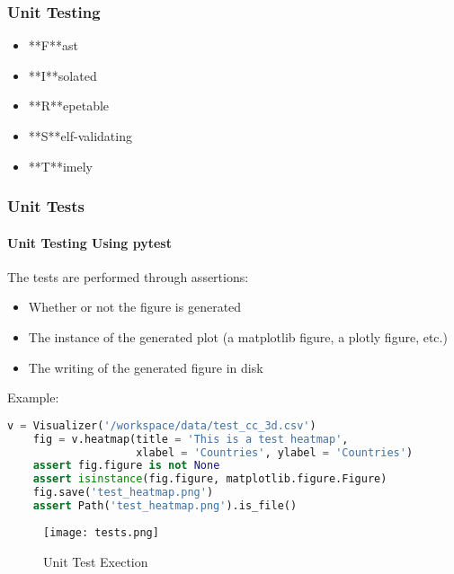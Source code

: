 \begin{frame}
  \frametitle{Unit Testing}

  \begin{itemize}
    \item **F**ast
    \item **I**solated
    \item **R**epetable 
    \item **S**elf-validating
    \item **T**imely
\end{itemize}

\end{frame}



\begin{frame}[fragile,shrink=30]
  \frametitle{Unit Tests}
  \framesubtitle{Unit Testing Using pytest}
  

  The tests are performed through assertions:
  \begin{itemize}
    \item Whether or not the figure is generated
    \item The instance of the generated plot (a matplotlib figure, a plotly figure, etc.) 
    \item The writing of the generated figure in disk
  \end{itemize}

  \vspace{5mm}

  Example:
  \begin{lstlisting}[language=Python]
    v = Visualizer('/workspace/data/test_cc_3d.csv')
    fig = v.heatmap(title = 'This is a test heatmap',
                    xlabel = 'Countries', ylabel = 'Countries')
    assert fig.figure is not None
    assert isinstance(fig.figure, matplotlib.figure.Figure)
    fig.save('test_heatmap.png')
    assert Path('test_heatmap.png').is_file()
  \end{lstlisting}

  \begin{figure}[h]
    \centering
    \texttt{[image: tests.png]}
    \caption{Unit Test Exection}
    \label{fig:tests}
  \end{figure}
  

\end{frame}

